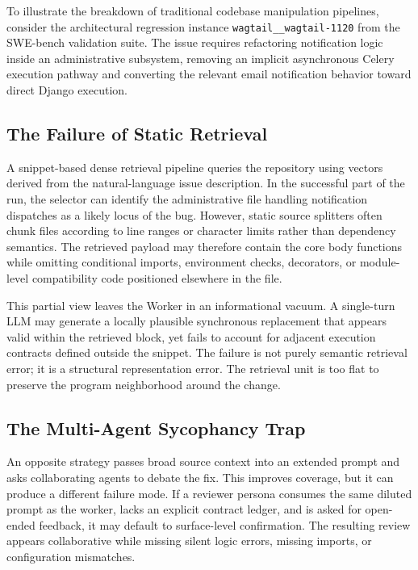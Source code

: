 To illustrate the breakdown of traditional codebase manipulation pipelines, consider the architectural regression instance \texttt{wagtail\_\_wagtail-1120} from the SWE-bench validation suite. The issue requires refactoring notification logic inside an administrative subsystem, removing an implicit asynchronous Celery execution pathway and converting the relevant email notification behavior toward direct Django execution.

\subsection{The Failure of Static Retrieval}

A snippet-based dense retrieval pipeline queries the repository using vectors derived from the natural-language issue description. In the successful part of the run, the selector can identify the administrative file handling notification dispatches as a likely locus of the bug. However, static source splitters often chunk files according to line ranges or character limits rather than dependency semantics. The retrieved payload may therefore contain the core body functions while omitting conditional imports, environment checks, decorators, or module-level compatibility code positioned elsewhere in the file.

This partial view leaves the Worker in an informational vacuum. A single-turn LLM may generate a locally plausible synchronous replacement that appears valid within the retrieved block, yet fails to account for adjacent execution contracts defined outside the snippet. The failure is not purely semantic retrieval error; it is a structural representation error. The retrieval unit is too flat to preserve the program neighborhood around the change.

\subsection{The Multi-Agent Sycophancy Trap}

An opposite strategy passes broad source context into an extended prompt and asks collaborating agents to debate the fix. This improves coverage, but it can produce a different failure mode. If a reviewer persona consumes the same diluted prompt as the worker, lacks an explicit contract ledger, and is asked for open-ended feedback, it may default to surface-level confirmation. The resulting review appears collaborative while missing silent logic errors, missing imports, or configuration mismatches.

